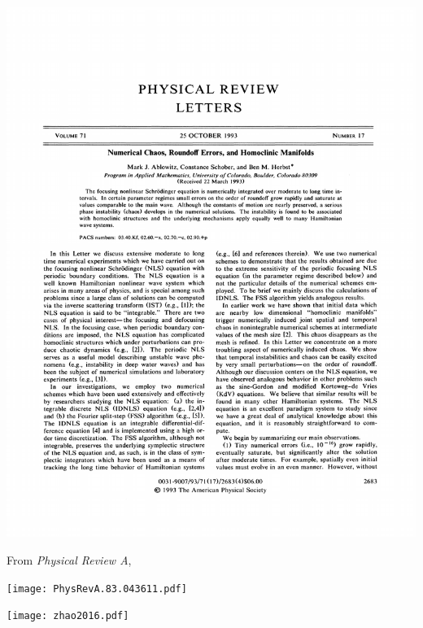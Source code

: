 \documentclass{homework}
\begin{document}
\begin{enumerate}
\begin{center}
			\includegraphics[width=\linewidth]{ablowitz1993.pdf}
		\end{center}
	
		\pagebreak
	
		From \textit{Physical Review A}, \begin{center}		
			\texttt{[image: PhysRevA.83.043611.pdf]}
			
			\texttt{[image: zhao2016.pdf]}
		\end{center}
	
	\pagebreak
	

\end{enumerate}
\end{document}
